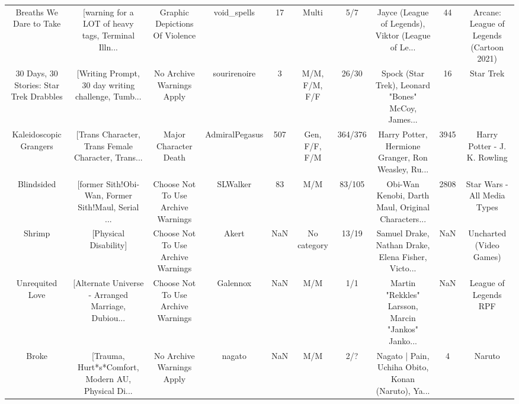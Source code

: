 \begin{table}[h!]
{\begin{tabular}{|c|c|c|c|c|c|c|c|c|c|}
                           Breaths We Dare to Take & [warning for a LOT of heavy tags, Terminal Illn... &                     Graphic Depictions Of Violence &                        void\_spells &        17 &                            Multi &      5/7 & Jayce (League of Legends), Viktor (League of Le... &       44 &           Arcane: League of Legends (Cartoon 2021) \\
           30 Days, 30 Stories: Star Trek Drabbles & [Writing Prompt, 30 day writing challenge, Tumb... &                          No Archive Warnings Apply &                       sourirenoire &         3 &                    M/M, F/M, F/F &    26/30 & Spock (Star Trek), Leonard "Bones" McCoy, James... &       16 &                                          Star Trek \\
                            Kaleidoscopic Grangers & [Trans Character, Trans Female Character, Trans... &                              Major Character Death &                     AdmiralPegasus &       507 &                    Gen, F/F, F/M &  364/376 & Harry Potter, Hermione Granger, Ron Weasley, Ru... &     3945 &                       Harry Potter - J. K. Rowling \\
                                        Blindsided & [former Sith!Obi-Wan, Former Sith!Maul, Serial ... &                 Choose Not To Use Archive Warnings &                           SLWalker &        83 &                              M/M &   83/105 & Obi-Wan Kenobi, Darth Maul, Original Characters... &     2808 &                        Star Wars - All Media Types \\
                                            Shrimp &                              [Physical Disability] &                 Choose Not To Use Archive Warnings &                              Akert &       NaN &                      No category &    13/19 & Samuel Drake, Nathan Drake, Elena Fisher, Victo... &      NaN &                            Uncharted (Video Games) \\
                                   Unrequited Love & [Alternate Universe - Arranged Marriage, Dubiou... &                 Choose Not To Use Archive Warnings &                           Galennox &       NaN &                              M/M &      1/1 & Martin "Rekkles" Larsson, Marcin "Jankos" Janko... &      NaN &                              League of Legends RPF \\
                                             Broke & [Trauma, Hurt*s*Comfort, Modern AU, Physical Di... &                          No Archive Warnings Apply &                             nagato &       NaN &                              M/M &      2/? & Nagato | Pain, Uchiha Obito, Konan (Naruto), Ya... &        4 &                                             Naruto \\

\end{tabular}}
\end{table}
